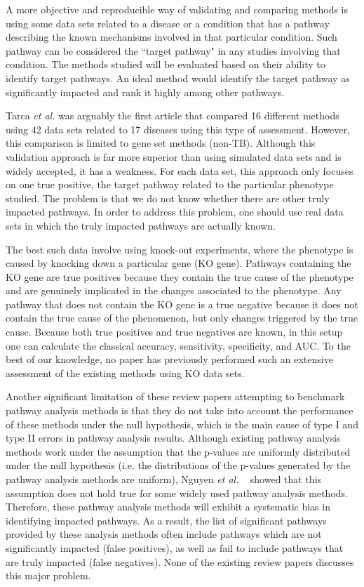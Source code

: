 A more objective and reproducible way of validating and comparing methods is using some data sets related to a disease or a condition that has a pathway describing the known mechanisms involved in that particular condition.
Such pathway can be considered the ``target pathway" in any studies involving that condition.
The methods studied will be evaluated based on their ability to identify target pathways. 
An ideal method would identify the target pathway as significantly impacted and rank it highly among other pathways.

Tarca \textit{et al.} \cite{tarca2013comparison} was arguably the first article that compared 16 different  methods using 42 data sets related to 17 diseases using this type of assessment. However, this comparison is limited to gene set methods (non-TB). 
Although this validation approach is far more superior than using simulated data sets and is widely accepted, it has a weakness. For each data set, this approach only focuses on one true positive, the target pathway related to the particular phenotype studied. The problem is that we do not know whether there are other truly impacted pathways. 
In order to address this problem, one should use real data sets in which the truly impacted pathways are actually known. 


The best such data involve using knock-out experiments, where the phenotype is caused by knocking down a particular gene (KO gene). Pathways containing the KO gene are true positives because they contain the true cause of the phenotype and are genuinely implicated in the changes associated to the phenotype. Any pathway that does not contain the KO gene is a true negative because it does not contain the true cause of the phenomenon, but only changes triggered by the true cause. Because both true positives and true negatives are known, in this setup one can calculate the classical  accuracy, sensitivity, specificity, and  AUC. To the best of our knowledge, no paper has previously performed such an extensive assessment of the existing methods using KO data sets.

Another significant limitation of these review papers attempting to benchmark pathway analysis methods is that they do not take into account the performance of these methods under the null hypothesis, which is the main cause of type I and type II errors in pathway analysis results. 
Although existing pathway analysis methods work under the assumption that the p-values are uniformly distributed under the null hypothesis (i.e. the distributions of the p-values generated by the pathway analysis methods are uniform), Nguyen \textit{et al.} ~\cite{nguyen2017DANUBE, nguyen2018network} showed that this assumption does not hold true for some widely used pathway analysis methods. 
Therefore, these pathway analysis methods will exhibit a systematic bias in identifying impacted pathways.
As a result, the list of significant pathways provided by these  analysis methods often include pathways which are not significantly impacted (false positives), as well as fail to include pathways that are truly impacted (false negatives).
None of the existing review papers discusses this major problem.


